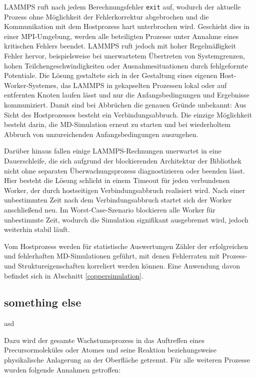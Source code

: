 LAMMPS ruft nach jedem Berechnungsfehler \texttt{exit} auf, wodurch der aktuelle Prozess ohne Möglichkeit der Fehlerkorrektur abgebrochen und die Kommunikation mit dem Hostprozess hart unterbrochen wird.
Geschieht dies in einer MPI-Umgebung, werden alle beteiligten Prozesse unter Annahme eines kritischen Fehlers beendet.
LAMMPS ruft jedoch mit hoher Regelmäßigkeit Fehler hervor, beispielsweise bei unerwartetem Übertreten von Systemgrenzen, hohen Teilchengeschwindigkeiten oder Ausnahmesituationen durch fehlgeformte Potentiale.
Die Lösung gestaltete sich in der Gestaltung eines eigenen Host-Worker-Systemes, das LAMMPS in gekapselten Prozessen lokal oder auf entfernten Knoten laufen lässt und nur die Anfangsbedingungen und Ergebnisse kommuniziert.
Damit sind bei Abbrüchen die genauen Gründe unbekannt: Aus Sicht des Hostprozesses besteht ein Verbindungsabbruch.
Die einzige Möglichkeit besteht darin, die MD-Simulation erneut zu starten und bei wiederholtem Abbruch von unzureichenden Anfangsbedingungen auszugehen.

Darüber hinaus fallen einige LAMMPS-Rechnungen unerwartet in eine Dauerschleife, die sich aufgrund der blockierenden Architektur der Bibliothek nicht ohne separaten Überwachungsprozess diagnostizieren oder beenden lässt.
Hier besteht die Lösung schlicht in einem Timeout für jeden verbundenen Worker, der durch hostseitigen Verbindungsabbruch realisiert wird.
Nach einer unbestimmten Zeit nach dem Verbindungsabbruch startet sich der Worker anschließend neu.
Im Worst-Case-Szenario blockieren alle Worker für unbestimmte Zeit, wodurch die Simulation signifikant ausgebremst wird, jedoch weiterhin stabil läuft.

Vom Hostprozess werden für statistische Auswertungen Zähler der erfolgreichen und fehlerhaften MD-Simulationen geführt, mit denen Fehlerraten mit Prozess- und Struktureigenschaften korreliert werden können.
Eine Anwendung davon befindet sich in Abschnitt \ref{coppersimulation}.

\subsection{something else}

asd

Dazu wird der gesamte Wachstumsprozess in das Auftreffen eines Precursormoleküles oder Atomes und seine Reaktion beziehungsweise physikalische Anlagerung an der Oberfläche getrennt.
Für alle weiteren Prozesse wurden folgende Annahmen getroffen:

